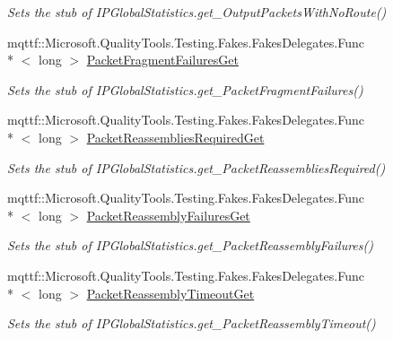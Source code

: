 \begin{DoxyCompactItemize}
\begin{DoxyCompactList}\small\item\em Sets the stub of I\-P\-Global\-Statistics.\-get\-\_\-\-Output\-Packets\-With\-No\-Route()\end{DoxyCompactList}\item 
mqttf\-::\-Microsoft.\-Quality\-Tools.\-Testing.\-Fakes.\-Fakes\-Delegates.\-Func\\*
$<$ long $>$ \hyperlink{class_system_1_1_net_1_1_network_information_1_1_fakes_1_1_stub_i_p_global_statistics_a4fd17d272a46dd8cb86773df5bcf9dbe}{Packet\-Fragment\-Failures\-Get}
\begin{DoxyCompactList}\small\item\em Sets the stub of I\-P\-Global\-Statistics.\-get\-\_\-\-Packet\-Fragment\-Failures()\end{DoxyCompactList}\item 
mqttf\-::\-Microsoft.\-Quality\-Tools.\-Testing.\-Fakes.\-Fakes\-Delegates.\-Func\\*
$<$ long $>$ \hyperlink{class_system_1_1_net_1_1_network_information_1_1_fakes_1_1_stub_i_p_global_statistics_a3238bb553230b9b219327dff1777e03c}{Packet\-Reassemblies\-Required\-Get}
\begin{DoxyCompactList}\small\item\em Sets the stub of I\-P\-Global\-Statistics.\-get\-\_\-\-Packet\-Reassemblies\-Required()\end{DoxyCompactList}\item 
mqttf\-::\-Microsoft.\-Quality\-Tools.\-Testing.\-Fakes.\-Fakes\-Delegates.\-Func\\*
$<$ long $>$ \hyperlink{class_system_1_1_net_1_1_network_information_1_1_fakes_1_1_stub_i_p_global_statistics_a4ec5161c47afc313ea061045725f4141}{Packet\-Reassembly\-Failures\-Get}
\begin{DoxyCompactList}\small\item\em Sets the stub of I\-P\-Global\-Statistics.\-get\-\_\-\-Packet\-Reassembly\-Failures()\end{DoxyCompactList}\item 
mqttf\-::\-Microsoft.\-Quality\-Tools.\-Testing.\-Fakes.\-Fakes\-Delegates.\-Func\\*
$<$ long $>$ \hyperlink{class_system_1_1_net_1_1_network_information_1_1_fakes_1_1_stub_i_p_global_statistics_a47d7e66531087a5eec02d994009c49a7}{Packet\-Reassembly\-Timeout\-Get}
\begin{DoxyCompactList}\small\item\em Sets the stub of I\-P\-Global\-Statistics.\-get\-\_\-\-Packet\-Reassembly\-Timeout()\end{DoxyCompactList}\item 

\end{DoxyCompactItemize}
